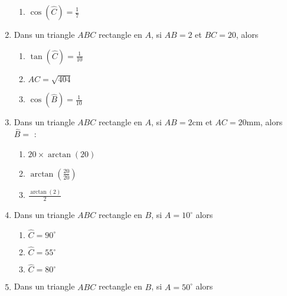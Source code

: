 \documentclass[oneside,twoside]{book}
\begin{document}
\begin{enumerate}
\begin{enumerate}
\item\MauvaiseReponse $\cos (\hat{C})=\frac{1}{7}$

\end{enumerate}



\item Dans un triangle $ABC$ rectangle en $A$, si $AB=2$ et $BC=20$, alors

\begin{enumerate}

\item\MauvaiseReponse $\tan (\hat{C})=\frac{1}{10}$

\item\MauvaiseReponse $AC=\sqrt{404}$

\item\BonneReponse $\cos (\hat{B})=\frac{1}{10}$

\end{enumerate}



\item Dans un triangle $ABC$ rectangle en $A$, si $AB=2\mathrm{cm}$ et $AC=20\mathrm{mm}$, alors $\hat{B}=$ :

\begin{enumerate}

\item\MauvaiseReponse $20\times\arctan\left(20\right)$

\item\BonneReponse $\arctan\left(\frac{20}{20}\right)$

\item\MauvaiseReponse $\frac{\arctan\left(2\right)}{2}$

\end{enumerate}


\item Dans un triangle $ABC$ rectangle en $B$, si $\widehat{A}=10^{\circ}$ alors

\begin{enumerate}

\item\MauvaiseReponse $\widehat{C}=90^{\circ}$

\item\MauvaiseReponse $\widehat{C}=55^{\circ}$

\item\BonneReponse $\widehat{C}=80^{\circ}$

\end{enumerate}


\item Dans un triangle $ABC$ rectangle en $B$, si $\widehat{A}=50^{\circ}$ alors


\end{enumerate}
\end{document}
